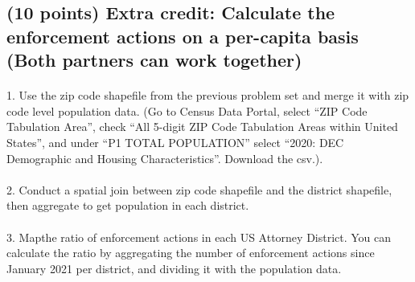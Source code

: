 \documentclass[
  letterpaper,
  DIV=11,
  numbers=noendperiod]{scrartcl}
\makeatletter
\let\oldparagraph\paragraph
\renewcommand{\paragraph}{
    \@ifstar
      \xxxParagraphStar
      \xxxParagraphNoStar
  }
\newcommand{\xxxParagraphStar}[1]{\oldparagraph*{#1}\mbox{}}
\newcommand{\xxxParagraphNoStar}[1]{\oldparagraph{#1}\mbox{}}
\makeatother
\begin{document}
\subsection{(10 points) Extra credit: Calculate the enforcement actions
on a per-capita basis (Both partners can work
together)}\label{points-extra-credit-calculate-the-enforcement-actions-on-a-per-capita-basis-both-partners-can-work-together}

\paragraph{1. Use the zip code shapefile from the previous problem set
and merge it with zip code level population data. (Go to Census Data
Portal, select ``ZIP Code Tabulation Area'', check ``All 5-digit ZIP
Code Tabulation Areas within United States'', and under ``P1 TOTAL
POPULATION'' select ``2020: DEC Demographic and Housing
Characteristics''. Download the
csv.).}\label{use-the-zip-code-shapefile-from-the-previous-problem-set-and-merge-it-with-zip-code-level-population-data.-go-to-census-data-portal-select-zip-code-tabulation-area-check-all-5-digit-zip-code-tabulation-areas-within-united-states-and-under-p1-total-population-select-2020-dec-demographic-and-housing-characteristics.-download-the-csv..}

\paragraph{2. Conduct a spatial join between zip code shapefile and the
district shapefile, then aggregate to get population in each
district.}\label{conduct-a-spatial-join-between-zip-code-shapefile-and-the-district-shapefile-then-aggregate-to-get-population-in-each-district.}

\paragraph{3. Mapthe ratio of enforcement actions in each US Attorney
District. You can calculate the ratio by aggregating the number of
enforcement actions since January 2021 per district, and dividing it
with the population
data.}\label{mapthe-ratio-of-enforcement-actions-in-each-us-attorney-district.-you-can-calculate-the-ratio-by-aggregating-the-number-of-enforcement-actions-since-january-2021-per-district-and-dividing-it-with-the-population-data.}
\end{document}
